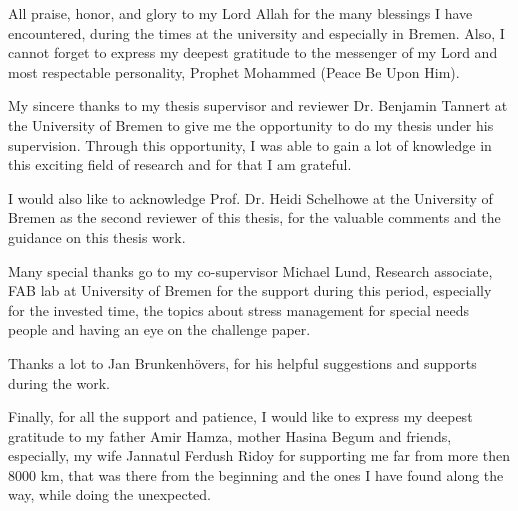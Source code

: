 \begin{acknowledgements}

All praise, honor, and glory to my Lord Allah for the many blessings I have encountered, during the times at the university and especially in Bremen. Also, I cannot
forget to express my deepest gratitude to the messenger of my Lord and most
respectable personality, Prophet Mohammed (Peace Be Upon Him).

My sincere thanks to my thesis supervisor and reviewer Dr. Benjamin Tannert at the University
of Bremen to give me the opportunity to do my thesis under his supervision. Through
this opportunity, I was able to gain a lot of knowledge in this exciting field of research and for that I am grateful.

I would also like to acknowledge Prof. Dr. Heidi Schelhowe at the University of Bremen
as the second reviewer of this thesis, for the valuable comments and the guidance on this thesis work.

Many special thanks go to my co-supervisor Michael Lund, Research associate, FAB lab at University of Bremen for the support during this period, especially for the invested time, the topics about stress management for special needs people and having an eye on the challenge paper. 

Thanks a lot to Jan Brunkenhövers, for his helpful suggestions and supports during the work.

Finally, for all the support and patience, I would like to express my deepest gratitude to my father Amir Hamza, mother Hasina Begum and friends, especially, my wife Jannatul Ferdush Ridoy for supporting me far from more then 8000 km, that was there from the beginning and the ones I have found along the way, while doing the unexpected.
\end{acknowledgements}